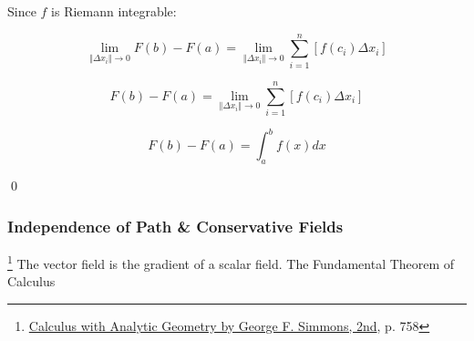 Since $f$ is Riemann integrable:

\begin{equation}
    \lim\limits_{\Vert \Delta x_i \Vert \rightarrow 0}F(b) - F(a) = \lim\limits_{\Vert \Delta x_i \Vert \rightarrow 0}\sum_{i = 1}^n \left[ f(c_i)\Delta x_i \right]
\end{equation}

\begin{equation}
    F(b) - F(a) = \lim\limits_{\Vert \Delta x_i \Vert \rightarrow 0}\sum_{i = 1}^n \left[ f(c_i)\Delta x_i \right]
\end{equation}

\begin{equation}
    F(b) - F(a) = \int_a^b f(x) dx
\end{equation}

\qed

\subsubsection{Independence of Path \& Conservative Fields}

\footnote{\href{https://trello.com/c/byu9Pyy8}{Calculus with Analytic Geometry by George F. Simmons, 2nd}, p. 758} The
vector field is the gradient of a scalar field. The Fundamental Theorem of Calculus
